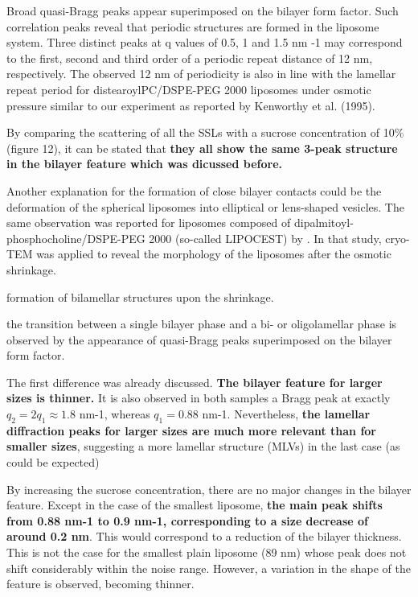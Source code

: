 Broad quasi-Bragg peaks appear superimposed on the bilayer form factor. Such correlation peaks reveal that periodic structures are formed in the liposome system. Three distinct peaks at q values of 0.5, 1 and 1.5 nm -1 may correspond to the first, second and third order of a periodic repeat distance of 12 nm, respectively. The observed 12 nm of periodicity is also in line with the lamellar repeat period for distearoylPC/DSPE-PEG 2000 liposomes under osmotic pressure similar to our experiment as reported by Kenworthy et al. (1995).

By comparing the scattering of all the SSLs with a sucrose concentration of 10$\%$ (figure 12), it can be stated that \textbf{they all show the same 3-peak structure in the bilayer feature which was dicussed before.}

Another explanation for the formation of close bilayer contacts could be the deformation of the spherical liposomes into elliptical or lens-shaped vesicles. The same observation was reported for liposomes composed of dipalmitoyl-phosphocholine/DSPE-PEG 2000 (so-called LIPOCEST) by \cite{terreno_osmotically_2009}. In that study, cryo-TEM was applied to reveal the morphology of the liposomes after the osmotic shrinkage.

formation of bilamellar structures upon the shrinkage.

the transition between a single bilayer phase and a bi- or oligolamellar phase is observed by the appearance of quasi-Bragg peaks superimposed on the bilayer form factor. \cite{deme_giant_2002}

The first difference was already discussed. \textbf{The bilayer feature for larger sizes is thinner.} It is also observed in both samples a Bragg peak at exactly $q_2=2q_1\approx1.8$ nm-1, whereas $q_1=0.88$ nm-1. Nevertheless, \textbf{the lamellar diffraction peaks for larger sizes are much more relevant than for smaller sizes}, suggesting a more lamellar structure (MLVs) in the last case (as could be expected)

By increasing the sucrose concentration, there are no major changes in the bilayer feature. Except in the case of the smallest liposome, \textbf{the main peak shifts from 0.88 nm-1 to 0.9 nm-1, corresponding to a size decrease of around 0.2 nm}. This would correspond to a reduction of the bilayer thickness. This is not the case for the smallest plain liposome (89 nm) whose peak does not shift considerably within the noise range. However, a variation in the shape of the feature is observed, becoming thinner.

